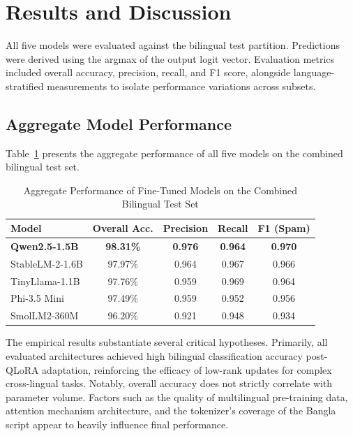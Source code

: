 \documentclass[journal]{IEEEtran}
\begin{document}
\section{Results and Discussion}

All five models were evaluated against the bilingual test partition. Predictions were derived using the argmax of the output logit vector. Evaluation metrics included overall accuracy, precision, recall, and F1 score, alongside language-stratified measurements to isolate performance variations across subsets.

\subsection{Aggregate Model Performance}

Table~\ref{tab:aggregate_results} presents the aggregate performance of all five models on the combined bilingual test set.

\begin{table}[htbp]
\caption{Aggregate Performance of Fine-Tuned Models on the Combined Bilingual Test Set}
\label{tab:aggregate_results}
\centering
\begin{tabular}{lcccc}
\toprule
\textbf{Model} & \textbf{Overall Acc.} & \textbf{Precision} & \textbf{Recall} & \textbf{F1 (Spam)} \\
\midrule
\rowcolor{gray!20} \textbf{Qwen2.5-1.5B} & \textbf{98.31\%} & \textbf{0.976} & \textbf{0.964} & \textbf{0.970} \\
StableLM-2-1.6B & 97.97\% & 0.964 & 0.967 & 0.966 \\
TinyLlama-1.1B & 97.76\% & 0.959 & 0.969 & 0.964 \\
Phi-3.5 Mini & 97.49\% & 0.959 & 0.952 & 0.956 \\
SmolLM2-360M & 96.20\% & 0.921 & 0.948 & 0.934 \\
\bottomrule
\end{tabular}
\end{table}



The empirical results substantiate several critical hypotheses. Primarily, all evaluated architectures achieved high bilingual classification accuracy post-QLoRA adaptation, reinforcing the efficacy of low-rank updates for complex cross-lingual tasks. Notably, overall accuracy does not strictly correlate with parameter volume. Factors such as the quality of multilingual pre-training data, attention mechanism architecture, and the tokenizer's coverage of the Bangla script appear to heavily influence final performance.
\end{document}
